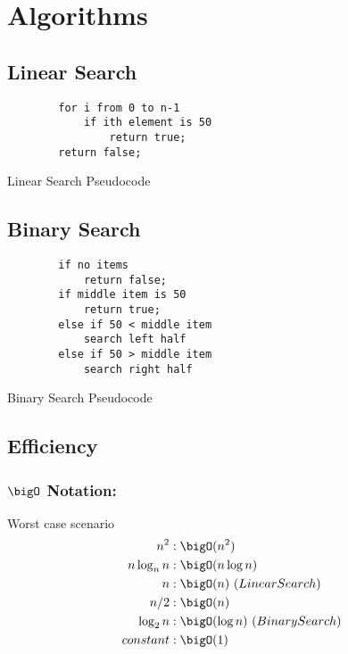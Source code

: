 \chapter{Algorithms}
\section{Linear Search}
\begin{code}
	\begin{verbatim}
		for i from 0 to n-1
			if ith element is 50
				return true;
		return false;
	\end{verbatim}
	\caption{Linear Search Pseudocode}
\end{code}
\section{Binary Search}
\begin{code}
	\begin{verbatim}
		if no items 
			return false;
		if middle item is 50
			return true;
		else if 50 < middle item 
			search left half
		else if 50 > middle item
			search right half
	\end{verbatim}
	\caption{Binary Search Pseudocode}
\end{code}
\section{Efficiency}
\subsection{\texorpdfstring{$\bigO$ Notation:}{}} Worst case scenario
\begin{align*}
	n^2        & : \bigO(n^2)                       \\
	n\log_n{n} & : \bigO(n\log{n})                  \\
	n          & : \bigO(n) \ (Linear Search)       \\
	n/2        & : \bigO(n)                         \\
	\log_2{n}  & : \bigO(\log{n}) \ (Binary Search) \\
	{constant} & : \bigO(1)                         \\
\end{align*}
